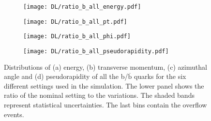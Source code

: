 \begin{figure}[H]
    \centering
    \begin{subfigure}{0.49\textwidth}
        \centering
        \texttt{[image: DL/ratio\_b\_all\_energy.pdf]}
        \caption{}
        \label{app:subfig:Ε(b_all)_DL}
    \end{subfigure}
    \begin{subfigure}{0.49\textwidth}
        \centering
        \texttt{[image: DL/ratio\_b\_all\_pt.pdf]}
        \caption{}
        \label{app:subfig:pt(b_all)_DL}
    \end{subfigure}

    \vspace{0.2cm}
    
    \begin{subfigure}{0.49\textwidth}
        \centering
        \texttt{[image: DL/ratio\_b\_all\_phi.pdf]}
        \caption{}
        \label{app:subfig:phi(b_all)_DL}
    \end{subfigure}
    \begin{subfigure}{0.49\textwidth}
        \centering
        \texttt{[image: DL/ratio\_b\_all\_pseudorapidity.pdf]}
        \caption{}
        \label{app:subfig:eta(b_all)_DL}
    \end{subfigure}
    \caption{Distributions of (a) energy, (b) transverse momentum,  (c) azimuthal angle and (d) pseudorapidity of all the b/$\overline{\text{b}}$ quarks for the six different settings used in the simulation. The lower panel shows the ratio of the nominal setting to the variations. The shaded bands represent statistical uncertainties. The last bins contain the overflow events.}
    \label{app:fig:b_all_DL}
\end{figure}



